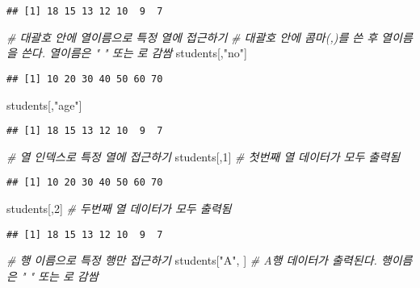 \documentclass[
]{article}
\newenvironment{Shaded}{\begin{snugshade}}{\end{snugshade}}
\newcommand{\CommentTok}[1]{\textcolor[rgb]{0.56,0.35,0.01}{\textit{#1}}}
\newcommand{\DecValTok}[1]{\textcolor[rgb]{0.00,0.00,0.81}{#1}}
\newcommand{\NormalTok}[1]{#1}
\newcommand{\StringTok}[1]{\textcolor[rgb]{0.31,0.60,0.02}{#1}}
\begin{document}
\begin{verbatim}
## [1] 18 15 13 12 10  9  7
\end{verbatim}

\begin{Shaded}
\begin{Highlighting}[]
\CommentTok{\# 대괄호 안에 열이름으로 특정 열에 접근하기}
\CommentTok{\# 대괄호 안에 콤마(,)를 쓴 후 열이름을 쓴다. 열이름은 " " 또는 \textquotesingle{} \textquotesingle{}로 감쌈}
\NormalTok{students[,}\StringTok{"no"}\NormalTok{]}
\end{Highlighting}
\end{Shaded}

\begin{verbatim}
## [1] 10 20 30 40 50 60 70
\end{verbatim}

\begin{Shaded}
\begin{Highlighting}[]
\NormalTok{students[,}\StringTok{"age"}\NormalTok{]}
\end{Highlighting}
\end{Shaded}

\begin{verbatim}
## [1] 18 15 13 12 10  9  7
\end{verbatim}

\begin{Shaded}
\begin{Highlighting}[]
\CommentTok{\# 열 인덱스로 특정 열에 접근하기}
\NormalTok{students[,}\DecValTok{1}\NormalTok{]  }\CommentTok{\# 첫번째 열 데이터가 모두 출력됨}
\end{Highlighting}
\end{Shaded}

\begin{verbatim}
## [1] 10 20 30 40 50 60 70
\end{verbatim}

\begin{Shaded}
\begin{Highlighting}[]
\NormalTok{students[,}\DecValTok{2}\NormalTok{]  }\CommentTok{\# 두번째 열 데이터가 모두 출력됨}
\end{Highlighting}
\end{Shaded}

\begin{verbatim}
## [1] 18 15 13 12 10  9  7
\end{verbatim}

\begin{Shaded}
\begin{Highlighting}[]
\CommentTok{\# 행 이름으로 특정 행만 접근하기}
\NormalTok{students[}\StringTok{"A"}\NormalTok{, ]  }\CommentTok{\# A행 데이터가 출력된다. 행이름은 " " 또는 \textquotesingle{} \textquotesingle{}로 감쌈}
\end{Highlighting}
\end{Shaded}
\end{document}

